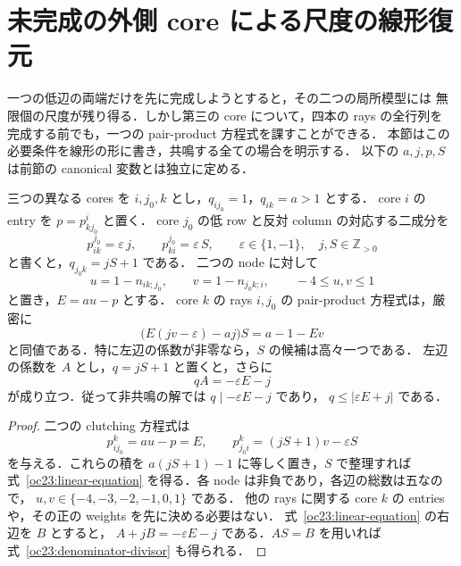 \section{未完成の外側 core による尺度の線形復元}
\label{oc23:section}

一つの低辺の両端だけを先に完成しようとすると，その二つの局所模型には
無限個の尺度が残り得る．しかし第三の core について，四本の rays の全行列を
完成する前でも，一つの pair-product 方程式を課すことができる．
本節はこの必要条件を線形の形に書き，共鳴する全ての場合を明示する．
以下の $a,j,p,S$ は前節の canonical 変数とは独立に定める．

\begin{lemma}
\label{oc23:linear-transfer}
三つの異なる cores を $i,j_0,k$ とし，$q_{ij_0}=1$，$q_{ik}=a>1$ とする．
core $i$ の entry を $p=p^i_{k j_0}$ と置く．
core $j_0$ の低 row と反対 column の対応する二成分を
\[
 p^{j_0}_{ik}=\varepsilon\,j,\qquad
 p^{j_0}_{ki}=\varepsilon\,S,
 \qquad \varepsilon\in\{1,-1\},\quad j,S\in\mathbb Z_{>0}
\]
と書くと，$q_{j_0k}=jS+1$ である．
二つの node に対して
\[
 u=1-n_{ik;j_0},\qquad v=1-n_{j_0k;i},
 \qquad -4\le u,v\le1
\]
と置き，$E=au-p$ とする．
core $k$ の rays $i,j_0$ の pair-product 方程式は，厳密に
\begin{equation}\label{oc23:linear-equation}
 \bigl(E(jv-\varepsilon)-aj\bigr)S=a-1-Ev
\end{equation}
と同値である．特に左辺の係数が非零なら，$S$ の候補は高々一つである．
左辺の係数を $A$ とし，$q=jS+1$ と置くと，さらに
\begin{equation}\label{oc23:denominator-divisor}
 qA=-\varepsilon E-j
\end{equation}
が成り立つ．従って非共鳴の解では $q\mid-\varepsilon E-j$ であり，
$q\le|\varepsilon E+j|$ である．
\end{lemma}

\begin{proof}
二つの clutching 方程式は
\[
 p^k_{ij_0}=au-p=E,\qquad
 p^k_{j_0i}=(jS+1)v-\varepsilon S
\]
を与える．これらの積を $a(jS+1)-1$ に等しく置き，$S$ で整理すれば
式~\eqref{oc23:linear-equation} を得る．各 node は非負であり，各辺の総数は五なので，
$u,v\in\{-4,-3,-2,-1,0,1\}$ である．
他の rays に関する core $k$ の entries や，その正の weights を先に決める必要はない．
式~\eqref{oc23:linear-equation} の右辺を $B$ とすると，
$A+jB=-\varepsilon E-j$ である．$AS=B$ を用いれば
式~\eqref{oc23:denominator-divisor} も得られる．
\end{proof}

